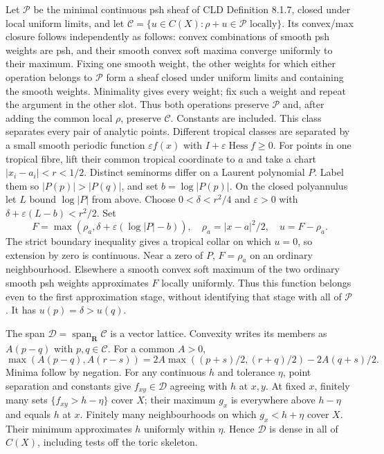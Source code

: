 \documentclass[11pt]{article}
\begin{document}
Let $\mathscr P$ be the minimal continuous psh sheaf of CLD Definition 8.1.7, closed under local uniform limits, and let $\mathcal C=\{u\in C(X):\rho+u\in\mathscr P\text{ locally}\}$. Its convex/max closure follows independently as follows: convex combinations of smooth psh weights are psh, and their smooth convex soft maxima converge uniformly to their maximum. Fixing one smooth weight, the other weights for which either operation belongs to $\mathscr P$ form a sheaf closed under uniform limits and containing the smooth weights. Minimality gives every weight; fix such a weight and repeat the argument in the other slot. Thus both operations preserve $\mathscr P$ and, after adding the common local $\rho$, preserve $\mathcal C$. Constants are included. This class separates every pair of analytic points. Different tropical classes are separated by a small smooth periodic function $\varepsilon f(x)$ with $I+\varepsilon\operatorname{Hess}f\ge0$. For points in one tropical fibre, lift their common tropical coordinate to $a$ and take a chart $|x_i-a_i|<r<1/2$. Distinct seminorms differ on a Laurent polynomial $P$. Label them so $|P(p)|>|P(q)|$, and set $b=\log|P(p)|$. On the closed polyannulus let $L$ bound $\log|P|$ from above. Choose $0<\delta<r^2/4$ and $\varepsilon>0$ with $\delta+\varepsilon(L-b)<r^2/2$. Set
\[
 F=\max(\rho_a,\delta+\varepsilon(\log|P|-b)),\quad
 \rho_a=|x-a|^2/2,\quad u=F-\rho_a.
\]
The strict boundary inequality gives a tropical collar on which $u=0$, so extension by zero is continuous. Near a zero of $P$, $F=\rho_a$ on an ordinary neighbourhood. Elsewhere a smooth convex soft maximum of the two ordinary smooth psh weights approximates $F$ locally uniformly. Thus this function belongs even to the first approximation stage, without identifying that stage with all of $\mathscr P$. It has $u(p)=\delta>u(q)$.

The span $\mathcal D=\operatorname{span}_{\mathbf R}\mathcal C$ is a vector lattice. Convexity writes its members as $A(p-q)$ with $p,q\in\mathcal C$. For a common $A>0$,
\[
 \max(A(p-q),A(r-s))=2A\max((p+s)/2,(r+q)/2)-2A(q+s)/2.
\]
Minima follow by negation. For any continuous $h$ and tolerance $\eta$, point separation and constants give $f_{xy}\in\mathcal D$ agreeing with $h$ at $x,y$. At fixed $x$, finitely many sets $\{f_{xy}>h-\eta\}$ cover $X$; their maximum $g_x$ is everywhere above $h-\eta$ and equals $h$ at $x$. Finitely many neighbourhoods on which $g_x<h+\eta$ cover $X$. Their minimum approximates $h$ uniformly within $\eta$. Hence $\mathcal D$ is dense in all of $C(X)$, including tests off the toric skeleton.
\end{document}
